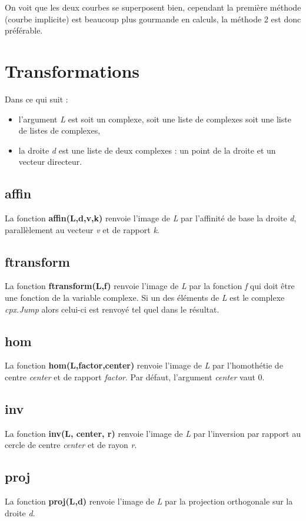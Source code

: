 \documentclass[%
10pt,%
a4paper,%
french,%
]%
{article}%
\begin{document}
On voit que les deux courbes se superposent bien, cependant la première méthode (courbe implicite) est beaucoup plus gourmande en calculs, la méthode 2 est donc préférable.


\section{Transformations}
Dans ce qui suit :
\begin{itemize}
    \item l'argument \emph{L} est soit un complexe, soit une liste de complexes soit une liste de listes de complexes,
    \item la droite \emph{d} est une liste de deux complexes : un point de la droite et un vecteur directeur.
  \end{itemize}
  
\subsection{affin}
La fonction \textbf{affin(L,d,v,k)} renvoie l'image de \emph{L} par l'affinité de base la droite \emph{d}, parallèlement au vecteur \emph{v} et de rapport \emph{k}.

\subsection{ftransform}
La fonction \textbf{ftransform(L,f)} renvoie l'image de \emph{L} par la fonction \emph{f} qui doit être une fonction de la variable complexe. Si un des éléments de \emph{L} est le complexe \emph{cpx.Jump} alors celui-ci est renvoyé tel quel dans le résultat.

\subsection{hom}
La fonction \textbf{hom(L,factor,center)} renvoie l'image de \emph{L} par l'homothétie de centre \emph{center} et de rapport \emph{factor}. Par défaut, l'argument \emph{center} vaut 0.

\subsection{inv}
La fonction \textbf{inv(L, center, r)} renvoie l'image de \emph{L} par l'inversion par rapport au cercle de centre \emph{center} et de rayon \emph{r}.

\subsection{proj}
La fonction \textbf{proj(L,d)} renvoie l'image de \emph{L} par la projection orthogonale sur la droite \emph{d}.
\end{document}
